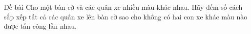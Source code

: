 Đề bài
Cho một bàn cờ và các quân xe nhiều màu khác nhau. Hãy đếm số cách sắp xếp tất cả các quân xe lên bàn cờ sao cho không có hai con xe khác màu nào được tấn công lẫn nhau.